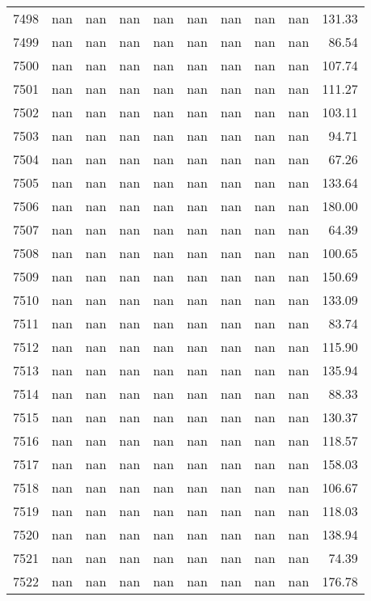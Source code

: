 \begin{tabular}{lrrrrrrrrr}
7498 & nan & nan & nan & nan & nan & nan & nan & nan & 131.33 \\
7499 & nan & nan & nan & nan & nan & nan & nan & nan & 86.54 \\
7500 & nan & nan & nan & nan & nan & nan & nan & nan & 107.74 \\
7501 & nan & nan & nan & nan & nan & nan & nan & nan & 111.27 \\
7502 & nan & nan & nan & nan & nan & nan & nan & nan & 103.11 \\
7503 & nan & nan & nan & nan & nan & nan & nan & nan & 94.71 \\
7504 & nan & nan & nan & nan & nan & nan & nan & nan & 67.26 \\
7505 & nan & nan & nan & nan & nan & nan & nan & nan & 133.64 \\
7506 & nan & nan & nan & nan & nan & nan & nan & nan & 180.00 \\
7507 & nan & nan & nan & nan & nan & nan & nan & nan & 64.39 \\
7508 & nan & nan & nan & nan & nan & nan & nan & nan & 100.65 \\
7509 & nan & nan & nan & nan & nan & nan & nan & nan & 150.69 \\
7510 & nan & nan & nan & nan & nan & nan & nan & nan & 133.09 \\
7511 & nan & nan & nan & nan & nan & nan & nan & nan & 83.74 \\
7512 & nan & nan & nan & nan & nan & nan & nan & nan & 115.90 \\
7513 & nan & nan & nan & nan & nan & nan & nan & nan & 135.94 \\
7514 & nan & nan & nan & nan & nan & nan & nan & nan & 88.33 \\
7515 & nan & nan & nan & nan & nan & nan & nan & nan & 130.37 \\
7516 & nan & nan & nan & nan & nan & nan & nan & nan & 118.57 \\
7517 & nan & nan & nan & nan & nan & nan & nan & nan & 158.03 \\
7518 & nan & nan & nan & nan & nan & nan & nan & nan & 106.67 \\
7519 & nan & nan & nan & nan & nan & nan & nan & nan & 118.03 \\
7520 & nan & nan & nan & nan & nan & nan & nan & nan & 138.94 \\
7521 & nan & nan & nan & nan & nan & nan & nan & nan & 74.39 \\
7522 & nan & nan & nan & nan & nan & nan & nan & nan & 176.78 \\

\end{tabular}
